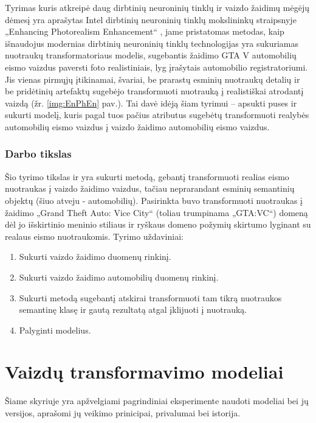 \documentclass{VUMIFPSbakalaurinis}
\begin{document}
    Tyrimas kuris atkreipė daug dirbtinių neuroninių tinklų ir vaizdo žaidimų mėgėjų dėmesį yra aprašytas Intel dirbtinių neuroninių tinklų mokslininkų straipsnyje „Enhancing Photorealism Enhancement“ \cite{EnPhEn}, jame pristatomas metodas, kaip išnaudojus modernias dirbtinių neuroninių tinklų technologijas yra sukuriamas nuotraukų transformatoriaus modelis, sugebantis žaidimo GTA V automobilių eismo vaizdus paversti foto realistiniais, lyg įrašytais automobilio registratoriumi. Jis vienas pirmųjų įtikinamai, švariai, be prarastų esminių nuotraukų detalių ir be pridėtinių artefaktų sugebėjo transformuoti nuotrauką į realistiškai atrodantį vaizdą (žr. \ref{img:EnPhEn} pav.). Tai davė idėją šiam tyrimui – apsukti puses ir sukurti modelį, kuris pagal tuos pačius atributus sugebėtų transformuoti realybės automobilių eismo vaizdus į vaizdo žaidimo automobilių eismo vaizdus.

    \subsubsection*{Darbo tikslas}
        Šio tyrimo tikslas ir yra sukurti metodą, gebantį transformuoti realias eismo nuotraukas į vaizdo žaidimo vaizdus, tačiau neprarandant esminių semantinių objektų (šiuo atveju - automobilių). Pasirinkta buvo transformuoti nuotraukas į  žaidimo „Grand Theft Auto: Vice City“ (toliau trumpinama „GTA:VC“) domeną dėl jo išskirtinio meninio stiliaus ir ryškaus domeno požymių skirtumo lyginant su realaus eismo nuotraukomis. Tyrimo uždaviniai:
        \begin{enumerate}
            \item Sukurti vaizdo žaidimo duomenų rinkinį.
            \item Sukurti vaizdo žaidimo automobilių duomenų rinkinį.
            \item Sukurti metodą sugebantį atskirai transformuoti tam tikrą nuotraukos semantinę klasę ir gautą rezultatą atgal įklijuoti į nuotrauką. 
            \item Palyginti modelius.
        \end{enumerate}

        \nocite{*}

\section{Vaizdų transformavimo modeliai}
    Šiame skyriuje yra apžvelgiami pagrindiniai eksperimente naudoti modeliai bei jų versijos, aprašomi jų veikimo prinicipai, privalumai bei istorija.
\end{document}

